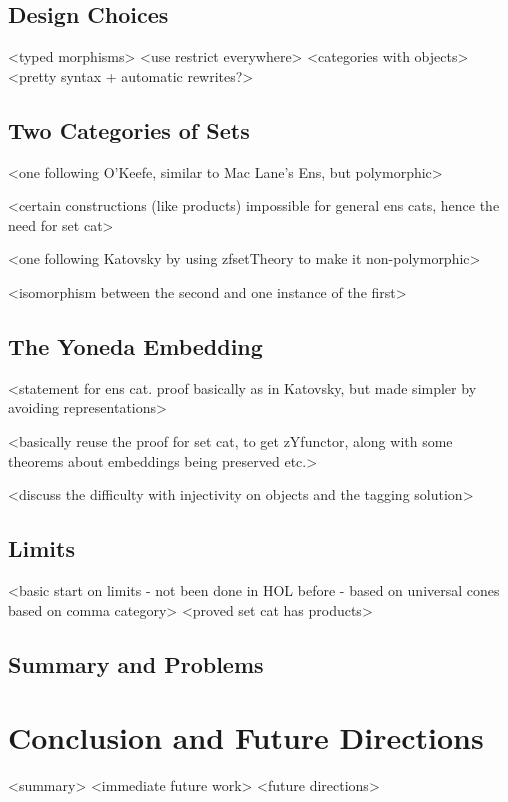 \documentclass[twoside,titlepage,11pt]{article}
\begin{document}
\subsection{Design Choices}%
<typed morphisms>
<use restrict everywhere>
<categories with objects>
<pretty syntax + automatic rewrites?>
\subsection{Two Categories of Sets}%
<one following O'Keefe, similar to Mac Lane's Ens, but polymorphic>

<certain constructions (like products) impossible for general ens cats, hence the need for set cat>

<one following Katovsky by using zfsetTheory to make it non-polymorphic>

<isomorphism between the second and one instance of the first>
\subsection{The Yoneda Embedding}%
<statement for ens cat. proof basically as in Katovsky, but made simpler by avoiding representations>

<basically reuse the proof for set cat, to get zYfunctor, along with some theorems about embeddings being preserved etc.>

<discuss the difficulty with injectivity on objects and the tagging solution>
\subsection{Limits}%
<basic start on limits - not been done in HOL before - based on universal cones based on comma category>
<proved set cat has products>
\subsection{Summary and Problems}%
\section{Conclusion and Future Directions}%
<summary>%
<immediate future work>%
<future directions>%


\end{document}
